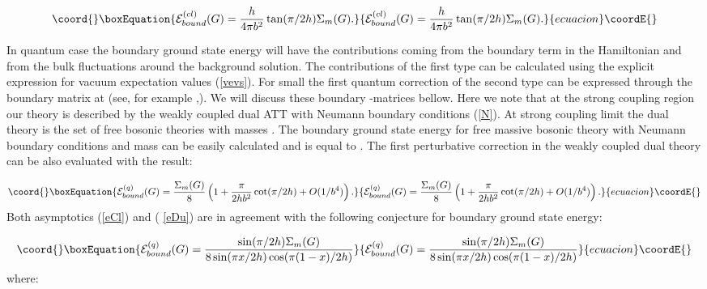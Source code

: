 \documentclass[a4paper,12pt]{article}
\begin{document}
\begin{equation}\coord{}\boxEquation{
\mathcal{E}_{bound}^{(cl)}(G)=\frac h{4\pi b^2}\tan (\pi /2h)\Sigma _m(G).
\label{eCl}
}{
\mathcal{E}_{bound}^{(cl)}(G)=\frac h{4\pi b^2}\tan (\pi /2h)\Sigma _m(G).
}{ecuacion}\coordE{}\end{equation}

In quantum case the boundary ground state energy \coordHE{}
will have the contributions coming from the boundary term in the Hamiltonian
and from the bulk fluctuations around the background solution. The
contributions of the first type can be calculated using the explicit
expression for vacuum expectation values (\ref{vevs}). For small \coordHE{} the
first quantum correction of the second type can be expressed through the
boundary \coordHE{}matrix at \coordHE{} (see, for example \cite{COD},\cite{COT}). We
will discuss these boundary \coordHE{}-matrices bellow. Here we note that at the
strong coupling region \coordHE{} our theory is described by the weakly coupled
dual ATT with Neumann boundary conditions (\ref{N}). At strong coupling
limit the dual theory is the set of \coordHE{} free bosonic theories with masses \coordHE{}.
The boundary ground state energy for free massive bosonic theory with
Neumann boundary conditions and mass \coordHE{} can be easily calculated and is
equal to \coordHE{}. The first perturbative correction in the weakly coupled
dual theory can be also evaluated with the result:

\begin{equation}\coord{}\boxEquation{
\mathcal{E}_{bound}^{(q)}(G)=\frac{\Sigma _m(G)}8\left( 1+\frac \pi
{2hb^2}\cot (\pi /2h)+O(1/b^4)\right) .  \label{eDu}
}{
\mathcal{E}_{bound}^{(q)}(G)=\frac{\Sigma _m(G)}8\left( 1+\frac \pi
{2hb^2}\cot (\pi /2h)+O(1/b^4)\right) .  }{ecuacion}\coordE{}\end{equation}
Both asymptotics \coordHE{} (\ref{eCl}) and \coordHE{} (%
\ref{eDu}) are in agreement with the following conjecture for boundary
ground state energy:

\begin{equation}\coord{}\boxEquation{
\mathcal{E}_{bound}^{(q)}(G)=\frac{\sin (\pi /2h)\Sigma _m(G)}
{8\sin (\pi x/2h)\cos (\pi (1-x)/2h)}  \label{eQ}
}{
\mathcal{E}_{bound}^{(q)}(G)=\frac{\sin (\pi /2h)\Sigma _m(G)}
{8\sin (\pi x/2h)\cos (\pi (1-x)/2h)}  }{ecuacion}\coordE{}\end{equation}
where:
\end{document}
